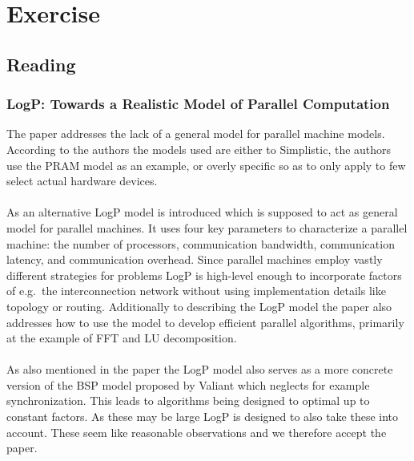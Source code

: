 \documentclass[]{scrartcl}
\newcommand{\exercise}{Exercise \thesection}
\begin{document}
\section*{\exercise}

\subsection{Reading}
\subsubsection{LogP: Towards a Realistic Model of Parallel Computation}
The paper addresses the lack of a general model for parallel machine models.
According to the authors the models used are either to Simplistic, the authors
use the PRAM model as an example, or overly specific so as to only apply to few
select actual hardware devices.
\\\\
As an alternative LogP model is introduced which is supposed to act as general
model for parallel machines. It uses four key parameters to characterize a
parallel machine: the number of processors, communication bandwidth, 
communication latency, and communication overhead.
Since parallel machines employ vastly different strategies for problems LogP
is high-level enough to incorporate factors of e.g.\ the interconnection network
without using implementation details like topology or routing.
Additionally to describing the LogP model the paper also addresses how to use
the model to develop efficient parallel algorithms, primarily at the example of
FFT and LU decomposition.
\\\\
As also mentioned in the paper the LogP model also serves as a more concrete
version of the BSP model proposed by Valiant which neglects for example
synchronization. This leads to algorithms being designed to optimal up to
constant factors. As these may be large LogP is designed to also take these into
account. These seem like reasonable observations and we therefore accept the
paper.
\end{document}
